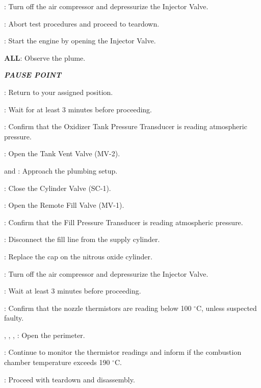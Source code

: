 \begin{checklist}
\begin{checklist}
\begin{checklist}[label=$\bullet$]
\begin{checklist}
    				\item \primary{}: Turn off the air compressor and depressurize the Injector Valve. 
    				\item \ops{}: Abort test procedures and proceed to teardown. 
    			\end{checklist}
    		\end{checklist}
    		\item \control{}: Start the engine by opening the Injector Valve. 
    	\end{checklist}
    	\item \textbf{ALL}: Observe the plume. 
    	\item \textbf{\textit{PAUSE POINT}}
    	\item \perii{}: Return to your assigned position. 
    	\item \ops{}: Wait for at least 3 minutes before proceeding. 
    	\item \daq{}: Confirm that the Oxidizer Tank Pressure Transducer is reading atmospheric pressure. 
    	\item \control{}: Open the Tank Vent Valve (MV-2).
    	\item \primary{} and \secondary{}: Approach the plumbing setup. 
    	\item \primary{}: Close the Cylinder Valve (SC-1). 
    	\item \control{}: Open the Remote Fill Valve (MV-1). 
    	\item \daq{}: Confirm that the Fill Pressure Transducer is reading atmospheric pressure. 
    	\item \primary{}: Disconnect the fill line from the supply cylinder. 
    	\item \primary{}: Replace the cap on the nitrous oxide cylinder. 
    	\item \primary{}: Turn off the air compressor and depressurize the Injector Valve. 
    	\item \ops{}: Wait at least 3 minutes before proceeding.
    	\item \daq{}: Confirm that the nozzle thermistors are reading below 100 $^\circ$C, unless suspected faulty. 
    	\item \peri{}, \perii{}, \periii{}, \periv{}: Open the perimeter. 
    	\item \daq{}: Continue to monitor the thermistor readings and inform \ops{} if the combustion chamber temperature exceeds 190 $^\circ$C.
    	\item \ops{}: Proceed with teardown and disassembly. 
\end{checklist}
\setcounter{checklistnum}{0}


	